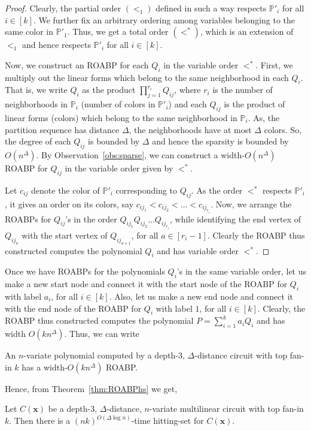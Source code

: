 \documentclass[final,oneeqnum, onethmnum, onefignum]{siamltex1213}
\renewcommand{\P}{\mathbb P}
\newcommand{\di}{\Delta} %
\begin{document}
\begin{proof}
Clearly, the partial order $(<_1)$ defined in such a way respects $\P'_i$
for all $i \in [k]$.
We further fix an arbitrary ordering among variables belonging to the same color
in $\P'_1$.
Thus, we get a total order $(<^*)$, which is an extension of $<_1$ and hence respects
$\P'_i$ for all $i \in [k]$.

Now, we construct an ROABP for each $Q_i$ in the variable order $<^*$.
First, we multiply out the linear forms which belong to the same neighborhood
in each $Q_i$. 
That is, we write $Q_i$ as the product $\prod_{j=1}^{r_i} Q_{ij}$,
where $r_i$ is the number of neighborhoods in $\P_i$ 
(number of colors in $\P'_i$) and
each $Q_{ij}$ is the product of linear forms (colors) 
which belong to the same neighborhood in $\P_i$. 
As, the partition sequence has distance $\di$, the neighborhoods
have at most $\di$ colors.
So, the degree of each $Q_{ij}$ is bounded by $\di$ and hence
the sparsity is bounded by $O(n^{\di})$.
By Observation~\ref{obs:sparse}, we can construct a width-$O(n^{\di})$ 
ROABP for $Q_{ij}$ in the variable order given by $<^*$.

Let $c_{ij}$ denote the color of $\P'_i$ corresponding to $Q_{ij}$.
As the order $<^*$ respects $\P'_i$, it gives an order on its colors,
say $c_{ij_1} < c_{ij_2} < \dots < c_{ij_{r_i}}$.
Now, we arrange the ROABPs for $Q_{ij}$'s in the order
$Q_{ij_1} Q_{ij_2} \dots Q_{ij_{r_i}}$, while identifying
the end vertex of $Q_{i j_{a}}$ with the start vertex of
$Q_{i j_{a+1}}$, for all $a \in [r_i-1]$.
Clearly the ROABP thus constructed computes the polynomial
$Q_i$ and has variable order $<^*$.

\end{proof}
 
Once we have ROABPs for the polynomials $Q_i$'s in the same
variable order, let us make a new start node and connect it with 
the start node of the ROABP for $Q_i$ with label $a_i$,
for all $i \in [k]$. Also, let us make a new end node and connect
it with the end node of the ROABP for $Q_i$ with label $1$,
for all $i \in [k]$. Clearly, the ROABP thus constructed computes
the polynomial $P = \sum_{i = 1}^k a_i Q_i$ and has width $O(kn^{\di})$.
Thus, we can write

\begin{lemma}[$\di$-distance to ROABP]
\label{lem:dDistROABP}
An $n$-variate polynomial computed by a depth-$3$, $\di$-distance circuit 
with top fan-in $k$ has a width-$O(kn^{\di})$
ROABP.
\end{lemma}

Hence, from Theorem~\ref{thm:ROABPhs} we get,
\begin{theorem}[$\di$-distance Hitting Set]
\label{thm:dDistancehs}
Let $C(\mathbf{x})$ be a depth-$3$, $\di$-distance, 
$n$-variate multilinear circuit with top fan-in $k$. Then
there is a $(nk)^{O(\di \log n)}$-time hitting-set for $C(\mathbf{x})$. 
\end{theorem}
\end{document}
